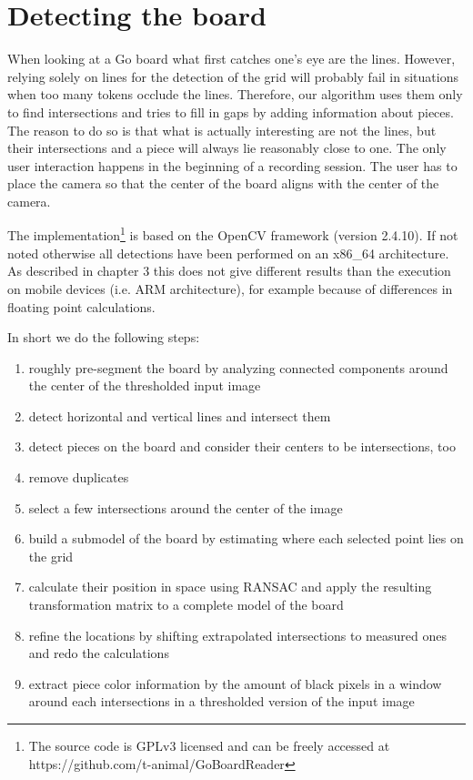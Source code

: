 
\chapter{Detecting the board}
	\label{detector}
	When looking at a Go board what first catches one's eye are the lines. However, relying solely on lines for the detection of the grid will probably fail in situations when too many tokens occlude the lines. Therefore, our algorithm uses them only to find intersections and tries to fill in gaps by adding information about pieces. The reason to do so is that what is actually interesting are not the lines, but their intersections and a piece will always lie reasonably close to one. The only user interaction happens in the beginning of a recording session. The user has to place the camera so that the center of the board aligns with the center of the camera.

	The implementation\footnote{The source code is GPLv3 licensed and can be freely accessed at https://github.com/t-animal/GoBoardReader} is based on the OpenCV framework (version 2.4.10). If not noted otherwise all detections have been performed on an x86\_64 architecture. As described in chapter 3 this does not give different results than the execution on mobile devices (i.e. ARM architecture), for example because of differences in floating point calculations.

	In short we do the following steps:
	\begin{enumerate}
		\item roughly pre-segment the board by analyzing connected components around the center of the thresholded input image
		\item detect horizontal and vertical lines and intersect them
		\item detect pieces on the board and consider their centers to be intersections, too
		\item remove duplicates
		\item select a few intersections around the center of the image
		\item build a submodel of the board by estimating where each selected point lies on the grid
		\item calculate their position in space using RANSAC and apply the resulting transformation matrix to a complete model of the board
		\item refine the locations by shifting extrapolated intersections to measured ones and redo the calculations
		\item extract piece color information by the amount of black pixels in a window around each intersections in a thresholded version of the input image
	\end{enumerate}

